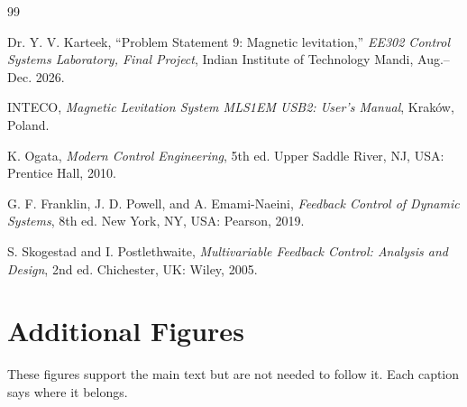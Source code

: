 \documentclass[11pt,a4paper]{article}
\begin{document}
\begin{thebibliography}{99}

Dr. Y. V. Karteek, ``Problem Statement 9: Magnetic levitation,'' \textit{EE302 Control Systems Laboratory, Final
Project}, Indian Institute of Technology Mandi, Aug.--Dec. 2026.

INTECO, \textit{Magnetic Levitation System MLS1EM USB2: User's Manual}, Krak\'ow, Poland.

K. Ogata, \textit{Modern Control Engineering}, 5th ed. Upper Saddle River, NJ, USA: Prentice Hall, 2010.

G. F. Franklin, J. D. Powell, and A. Emami-Naeini, \textit{Feedback Control of Dynamic Systems}, 8th ed. New York,
NY, USA: Pearson, 2019.

S. Skogestad and I. Postlethwaite, \textit{Multivariable Feedback Control: Analysis and Design}, 2nd ed. Chichester,
UK: Wiley, 2005.

\end{thebibliography}

\clearpage
\appendix
\section{Additional Figures}
\label{app:figs}
These figures support the main text but are not needed to follow it. Each caption says where it belongs.
\end{document}
